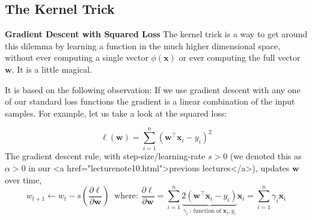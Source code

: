 \documentclass[12pt]{article}
\begin{document}
\subsection{ The Kernel Trick}
 \textbf{Gradient Descent with Squared Loss}
 The kernel trick is a way to get around this dilemma by learning a function in the much higher dimensional space, without ever computing a single vector $\phi(\mathbf{x})$ or ever computing the full vector $\mathbf{w}$. It is a little magical. 
 
 It is based on the following observation: If we use gradient descent with any one of our standard loss functions the gradient is a linear combination of the input samples. For example, let us take a look at the squared loss: 
 
 \begin{equation}
 \ell(\mathbf{w}) = \sum_{i=1}^n (\mathbf{w}^\top  \mathbf{x}_i-y_i)^2\label{eq:c15:sql}
 \end{equation}
 The gradient descent rule, with step-size/learning-rate $s>0$ (we denoted this as $\alpha>0$ in our <a href="lecturenote10.html">previous lectures</a>), updates $\mathbf{w}$ over time,
 \begin{equation}
 w_{t+1} \leftarrow w_t - s(\frac{\partial \ell}{\partial \mathbf{w}})\ \textrm{ where: }
 \frac{\partial \ell}{\partial \mathbf{w}}=\sum_{i=1}^n \underbrace{2(\mathbf{w}^\top  \mathbf{x}_i-y_i)}_{\gamma_i\ :\ \textrm{function of $\mathbf{x}_i, y_i$}} \mathbf{x}_i = \sum_{i=1}^n\gamma_i \mathbf{x}_i
 \end{equation}
 
\end{document}
